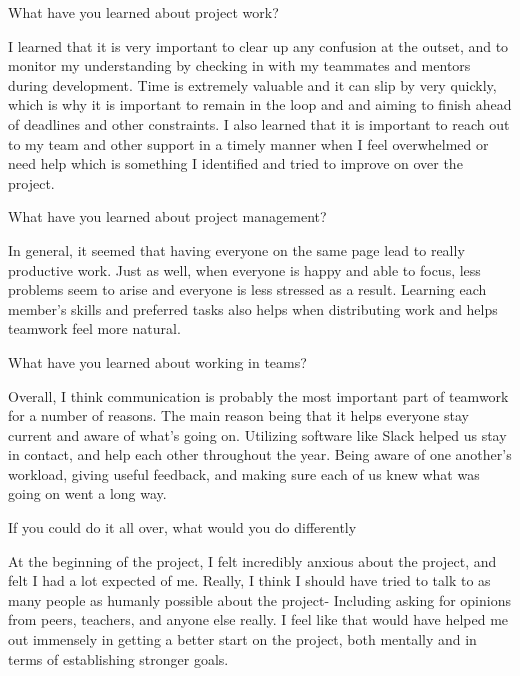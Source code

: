 \documentclass[letterpaper, 10pt, draftclsnofoot, compsoc, onecolumn]{IEEEtran}
\begin{document}
What have you learned about project work?

I learned that it is very important to clear up any confusion at the outset, and to monitor my understanding by checking in with my teammates and mentors during development. Time is extremely valuable and it can slip by very quickly, which is why it is important to remain in the loop and and aiming to finish ahead of deadlines and other constraints. I also learned that it is important to reach out to my team and other support in a timely manner when I feel overwhelmed or need help which is something I identified and tried to improve on over the project.

What have you learned about project management?

In general, it seemed that having everyone on the same page lead to really productive work. Just as well, when everyone is happy and able to focus, less problems seem to arise and everyone is less stressed as a result. Learning each member's skills and preferred tasks also helps when distributing work and helps teamwork feel more natural. 

What have you learned about working in teams?

Overall, I think communication is probably the most important part of teamwork for a number of  reasons. The main reason being that it helps everyone stay current and aware of what's going on. Utilizing software like Slack helped us stay in contact, and help each other throughout the year. Being aware of one another's workload, giving useful feedback, and making sure each of us knew what was going on went a long way. 

If you could do it all over, what would you do differently

At the beginning of the project, I felt incredibly anxious about the project, and felt I had a lot expected of me. Really, I think I should have tried to talk to as many people as humanly possible about the project- Including asking for opinions from peers, teachers, and anyone else really. I feel like that would have helped me out immensely in getting a better start on the project, both mentally and in terms of establishing stronger goals. 

\newpage
\end{document}
